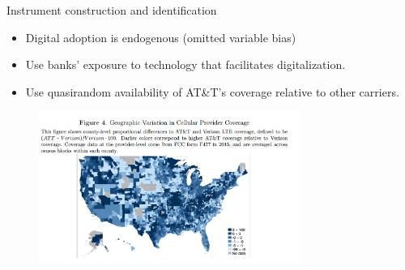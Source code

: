 \documentclass[notes,10pt, aspectratio=169]{beamer}
\begin{document}
\begin{frame}{Instrument construction and identification}

    \begin{itemize}
        \item Digital adoption is endogenous (omitted variable bias)
        \item Use banks' exposure to technology that facilitates digitalization.
        \item Use quasirandom availability of AT\&T's coverage relative to other carriers.

    \end{itemize}
    
    \begin{figure}
        \centering
        \includegraphics[width=0.76\textwidth]{imgs/fig4.png}
        \label{fig:my_label}
    \end{figure}
    
\end{frame}
\end{document}
